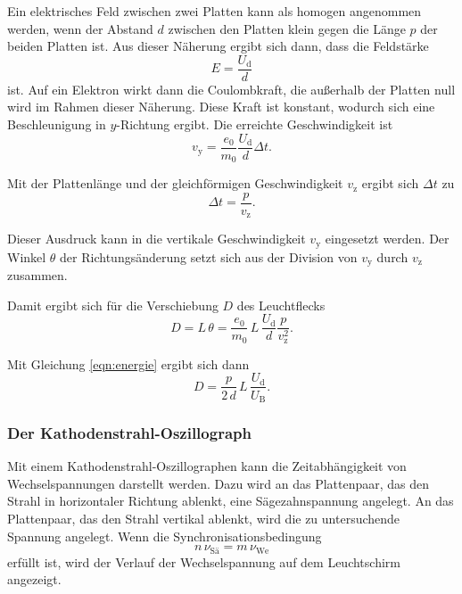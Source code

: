 \noindent 
Ein elektrisches Feld zwischen zwei Platten kann als homogen angenommen werden,
wenn der Abstand $d$ zwischen den Platten klein gegen die Länge $p$
der beiden Platten ist.
Aus dieser Näherung ergibt sich dann, dass die Feldstärke 
\begin{equation*}
    E = \frac{U_\text{d}}{d}
\end{equation*}
ist.
Auf ein Elektron wirkt dann die Coulombkraft, 
die außerhalb der Platten null wird im Rahmen dieser Näherung. Diese Kraft ist konstant, 
wodurch sich eine Beschleunigung in $y$-Richtung  
ergibt. 
Die erreichte Geschwindigkeit ist 
\begin{equation*}
    v_\text{y} = \frac{e_\text{0}}{m_\text{0}} \frac{U_\text{d}}{d} \Delta t.
\end{equation*}

\noindent Mit der Plattenlänge und der 
gleichförmigen Geschwindigkeit $v_\text{z}$ ergibt sich $\Delta t$ zu
\begin{equation*}
    \Delta t = \frac{p}{v_\text{z}}.
\end{equation*}

\noindent Dieser Ausdruck kann in die vertikale 
Geschwindigkeit $v_\text{y}$ eingesetzt werden. Der Winkel $\theta$ der 
Richtungsänderung setzt sich aus der Division von 
$v_\text{y}$ durch $v_\text{z}$ zusammen. 

\noindent Damit ergibt sich für die Verschiebung $D$ des Leuchtflecks 
\begin{equation*}
    D = L \, \theta = \frac{e_\text{0}}{m_\text{0}} \, L \, \frac{U_\text{d}}{d} \frac{p}{v_\text{z}^2}.
\end{equation*}

\noindent Mit Gleichung \eqref{eqn:energie} ergibt sich dann 
\begin{equation}
    D = \frac{p}{2\, d} \, L \, \frac{U_\text{d}}{U_\text{B}}.
    \label{eqn:leuchtfleck}
\end{equation}

\subsubsection{Der Kathodenstrahl-Oszillograph}
Mit einem Kathodenstrahl-Oszillographen kann die Zeitabhängigkeit
von Wechselspannungen darstellt werden.
Dazu wird an das Plattenpaar, das den Strahl in horizontaler
Richtung ablenkt, eine Sägezahnspannung angelegt. An das Plattenpaar,
das den Strahl vertikal ablenkt, wird die zu untersuchende
Spannung angelegt. Wenn die Synchronisationsbedingung
\begin{equation*}
    n \, \nu_\text{Sä} = m \, \nu_\text{We}
\end{equation*}
erfüllt ist, wird der Verlauf der Wechselspannung auf dem
Leuchtschirm angezeigt.


